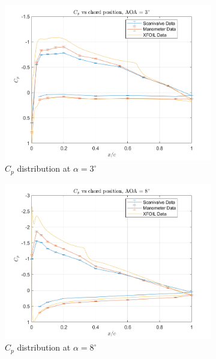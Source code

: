 \documentclass[runningheads]{llncs}
\begin{document}
\begin{figure}[H]
    \centering
    \begin{subfigure}[b]{0.37\textwidth}
        \centering
        \includegraphics[width=\textwidth]{figures/AOA3.png}
        \caption{$C_p$ distribution at $\alpha = 3^\circ$}
        \label{fig:cp_3}
    \end{subfigure}
    \begin{subfigure}[b]{0.37\textwidth}
        \centering
        \includegraphics[width=\textwidth]{figures/AOA8.png}
        \caption{$C_p$ distribution at $\alpha = 8^\circ$}
        \label{fig:cp_8}
    \end{subfigure}
    \begin{subfigure}[b]{0.37\textwidth}

\end{subfigure}
\end{figure}
\end{document}
